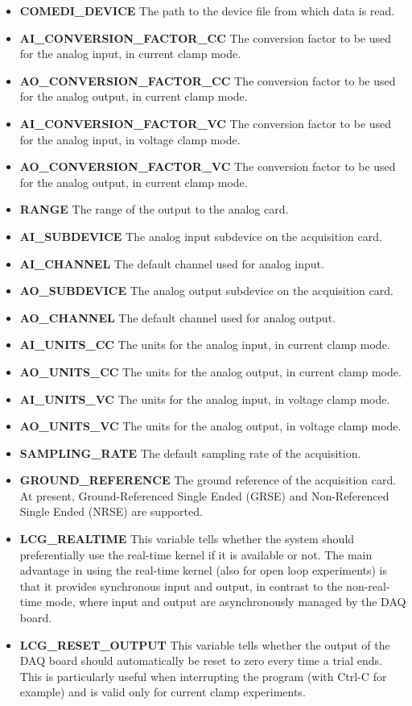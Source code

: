 \begin{itemize}
\item \textbf{COMEDI\_DEVICE} The path to the device file from which
  data is read.
\item \textbf{AI\_CONVERSION\_FACTOR\_CC} The conversion factor to be used for
  the analog input, in current clamp mode.
\item \textbf{AO\_CONVERSION\_FACTOR\_CC} The conversion factor to be used for
  the analog output, in current clamp mode.
\item \textbf{AI\_CONVERSION\_FACTOR\_VC} The conversion factor to be used for
  the analog input, in voltage clamp mode.
\item \textbf{AO\_CONVERSION\_FACTOR\_VC} The conversion factor to be used for
  the analog output, in current clamp mode.
\item \textbf{RANGE} The range of the output to the analog card.
\item \textbf{AI\_SUBDEVICE} The analog input subdevice on the
  acquisition card.
\item \textbf{AI\_CHANNEL} The default channel used for analog input.
\item \textbf{AO\_SUBDEVICE} The analog output subdevice on the
  acquisition card.
\item \textbf{AO\_CHANNEL} The default channel used for analog output.
\item \textbf{AI\_UNITS\_CC} The units for the analog input, in current
  clamp mode.
\item \textbf{AO\_UNITS\_CC} The units for the analog output, in current
  clamp mode.
\item \textbf{AI\_UNITS\_VC} The units for the analog input, in voltage
  clamp mode.
\item \textbf{AO\_UNITS\_VC} The units for the analog output, in voltage
  clamp mode.
\item \textbf{SAMPLING\_RATE} The default sampling rate of the acquisition.
\item \textbf{GROUND\_REFERENCE} The ground reference of the
  acquisition card. At present, Ground-Referenced Single Ended (GRSE)
  and Non-Referenced Single Ended (NRSE) are supported.
\item \textbf{LCG\_REALTIME} This variable tells whether the system
  should preferentially use the real-time kernel if it is available or
  not. The main advantage in using the real-time kernel (also for open
  loop experiments) is that it provides synchronous input and output,
  in contrast to the non-real-time mode, where input and output are
  asynchronously managed by the DAQ board.
\item \textbf{LCG\_RESET\_OUTPUT} This variable tells whether the
  output of the DAQ board should automatically be reset to zero every
  time a trial ends. This is particularly useful when interrupting the
  program (with Ctrl-C for example) and is valid only for current
  clamp experiments.
\end{itemize}
